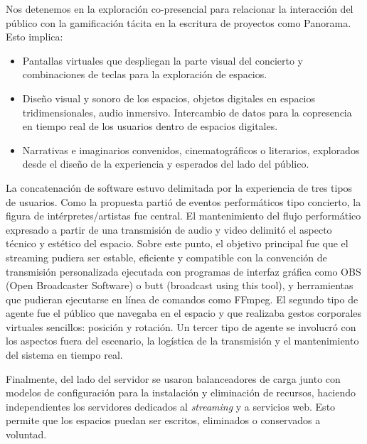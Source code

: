Nos detenemos en la exploración co-presencial para relacionar la interacción del público con la gamificación tácita en la escritura de proyectos como Panorama. Esto implica:

\begin{itemize}
\item Pantallas virtuales que despliegan la parte visual del concierto y combinaciones de teclas para la exploración de espacios.
\item Diseño visual y sonoro de los espacios, objetos digitales en espacios tridimensionales, audio inmersivo. 
Intercambio de datos para la copresencia en tiempo real de los usuarios dentro de espacios digitales. 
\item Narrativas e imaginarios convenidos, cinematográficos o literarios, explorados desde el diseño de la experiencia y esperados del lado del público. 
\end{itemize}



La concatenación de software estuvo delimitada por la experiencia de tres tipos de usuarios. Como la propuesta partió de eventos performáticos tipo concierto, la figura de intérpretes/artistas fue central. El mantenimiento del flujo performático expresado a partir de una transmisión de audio y video delimitó el aspecto técnico y estético del espacio. Sobre este punto, el objetivo principal fue que el streaming pudiera ser estable, eficiente y compatible con la convención de transmisión personalizada ejecutada con programas de interfaz gráfica como OBS (Open Broadcaster Software) o butt (broadcast using this tool), y herramientas que pudieran ejecutarse en línea de comandos como FFmpeg. El segundo tipo de agente fue el público que navegaba en el espacio y que realizaba gestos corporales virtuales sencillos: posición y rotación. Un tercer tipo de agente se involucró con los aspectos fuera del escenario, la logística de la transmisión y el mantenimiento del sistema en tiempo real.  


Finalmente, del lado del servidor se usaron balanceadores de carga junto con modelos de configuración para la instalación y eliminación de recursos, haciendo independientes los servidores dedicados al \emph{streaming} y a servicios web. Esto permite que los espacios puedan ser escritos, eliminados o conservados a voluntad.  
